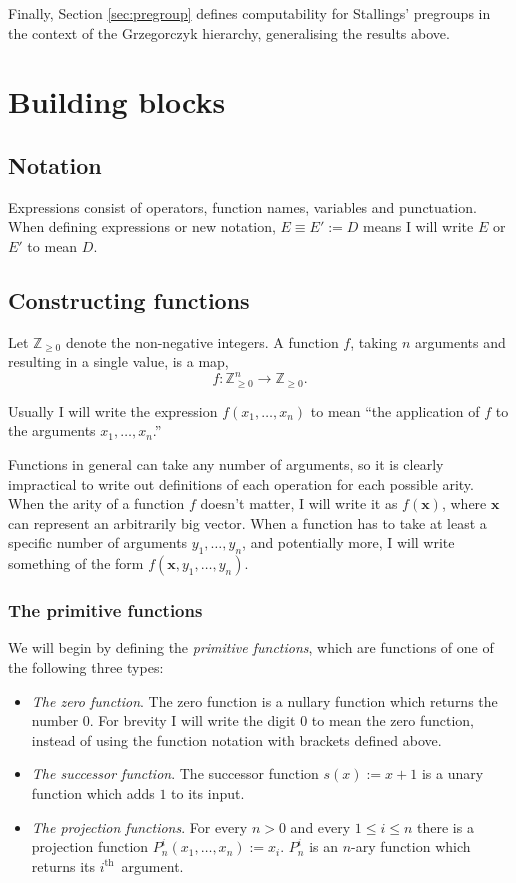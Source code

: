 \documentclass[a4paper]{article}
\newcommand{\ZZ}{\mathbb{Z}}
\newcommand{\ith}{$i^{\textrm{th}}$~}
\newcommand{\xvec}{\mathbf{x}}	%
\theoremstyle{plain}
\theoremstyle{definition}
\begin{document}
Finally, Section \ref{sec:pregroup} defines computability for Stallings' pregroups \cite{Stallings_1971} in the context of the Grzegorczyk hierarchy, generalising the results above.


\section{Building blocks \label{buildingblocks}}
 
\subsection{Notation}
Expressions consist of operators, function names, variables and punctuation. 
When defining expressions or new notation, $E \equiv E' := D$ means I will write $E$ or $E'$ to mean $D$.

\subsection{Constructing functions}
Let $\ZZ_{\geq 0}$ denote the non-negative integers. A function $f$, taking $n$ arguments and resulting in a single value, is a map,
\[f: \ZZ_{\geq 0}^n \rightarrow \ZZ_{\geq 0}.\]

Usually I will write the expression $f(x_1, \dots, x_n)$ to mean ``the application of $f$ to the arguments $x_1,\dots,x_n$.''

Functions in general can take any number of arguments, so it is clearly impractical to write out definitions of each operation for each possible arity. When the arity of a function $f$ doesn't matter, I will write it as $f(\xvec)$, where $\xvec$ can represent an arbitrarily big vector.  When a function has to take at least a specific number of arguments $y_1, \dots, y_n$, and potentially more, I will write something of the form $f(\xvec, y_1, \dots, y_n)$.

\subsubsection{The primitive functions}

We will begin by defining the {\it primitive functions}, which are functions of one of the following three types:

\begin{itemize}
	\item {\em The zero function}. The zero function  is a nullary function which returns the number $0$. For brevity I will write the digit $0$ to mean the zero function, instead of using the function notation with brackets defined above.
	\item {\em The successor function}. The successor function $s(x) := x + 1$ is a unary function which adds $1$ to its input.
	\item {\em The projection functions}. For every $n > 0 $ and every $1 \leq i \leq n$ there is a projection function $P_n^i(x_1, \dots, x_n) := x_i$. $P_n^i$ is an $n$-ary function which returns its \ith argument.
\end{itemize}
\end{document}
